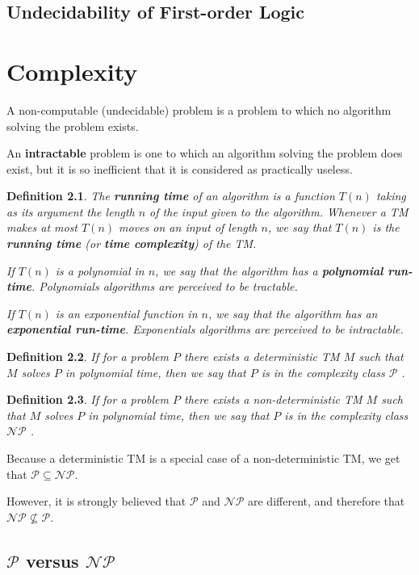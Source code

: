 \documentclass[a4paper,11pt]{report}
\newtheorem*{mydef}{Definition}
\newcommand{\Pc}{\ensuremath{\mathcal{P}} }
\newcommand{\NPc}{\ensuremath{\mathcal{NP}} }
\begin{document}
\section{Undecidability of First-order Logic}

\chapter{Complexity}

A non-computable (undecidable) problem is a problem to which no algorithm
solving the problem exists.

An \textbf{intractable} problem is one to which an algorithm solving the problem
does exist, but it is so inefficient that it is considered as practically
useless.

\begin{mydef}
  The \textbf{running time} of an algorithm is a function $T(n)$ taking as its
  argument the length $n$ of the input given to the algorithm. Whenever a TM
  makes at most $T(n)$ moves on an input of length $n$, we say that $T(n)$ is
  the \textbf{running time} (or \textbf{time complexity}) of the TM.

  If $T(n)$ is a polynomial in $n$, we say that the algorithm has a
  \textbf{polynomial run-time}. Polynomials algorithms are perceived to be
  tractable.
  
  If $T(n)$ is an exponential function in $n$, we say that the algorithm has an
  \textbf{exponential run-time}. Exponentials algorithms are perceived to be
  intractable.
\end{mydef}

\begin{mydef}
  If for a problem $P$ there exists a deterministic TM $M$ such that $M$ solves
  $P$ in polynomial time, then we say that $P$ is in the complexity class \Pc.
\end{mydef}

\begin{mydef}
  If for a problem $P$ there exists a non-deterministic TM $M$ such that $M$
  solves $P$ in polynomial time, then we say that $P$ is in the complexity class
  \NPc.
\end{mydef}

Because a deterministic TM is a special case of a non-deterministic TM, we get
that $\Pc \subseteq \NPc $.

However, it is strongly believed that \Pc and \NPc are different, and therefore
that $\NPc \not \subseteq \Pc$.

\section{\Pc versus \NPc}
\end{document}
